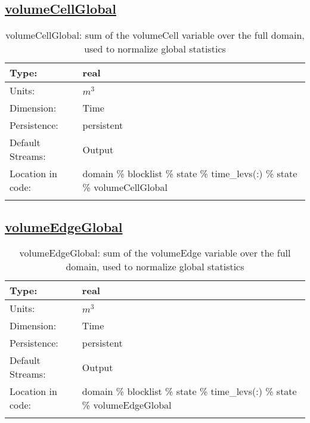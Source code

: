 \subsection[volumeCellGlobal]{\hyperref[sec:var_tab_state]{volumeCellGlobal}}
\label{subsec:var_sec_state_volumeCellGlobal}
\begin{center}
\begin{longtable}{| p{2.0in} | p{4.0in} |}
        \hline 
        Type: & real \\
        \hline 
        Units: & $m^3$ \\
        \hline 
        Dimension: & Time \\
        \hline 
        Persistence: & persistent \\
        \hline 
		 Default Streams: & Output  \\
        \hline 
		 Location in code: & domain \% blocklist \% state \% time\_levs(:) \% state \% volumeCellGlobal \\
		 \hline 
    \caption{volumeCellGlobal: sum of the volumeCell variable over the full domain, used to normalize global statistics}
\end{longtable}
\end{center}
\subsection[volumeEdgeGlobal]{\hyperref[sec:var_tab_state]{volumeEdgeGlobal}}
\label{subsec:var_sec_state_volumeEdgeGlobal}
\begin{center}
\begin{longtable}{| p{2.0in} | p{4.0in} |}
        \hline 
        Type: & real \\
        \hline 
        Units: & $m^3$ \\
        \hline 
        Dimension: & Time \\
        \hline 
        Persistence: & persistent \\
        \hline 
		 Default Streams: & Output  \\
        \hline 
		 Location in code: & domain \% blocklist \% state \% time\_levs(:) \% state \% volumeEdgeGlobal \\
		 \hline 
    \caption{volumeEdgeGlobal: sum of the volumeEdge variable over the full domain, used to normalize global statistics}
\end{longtable}
\end{center}
